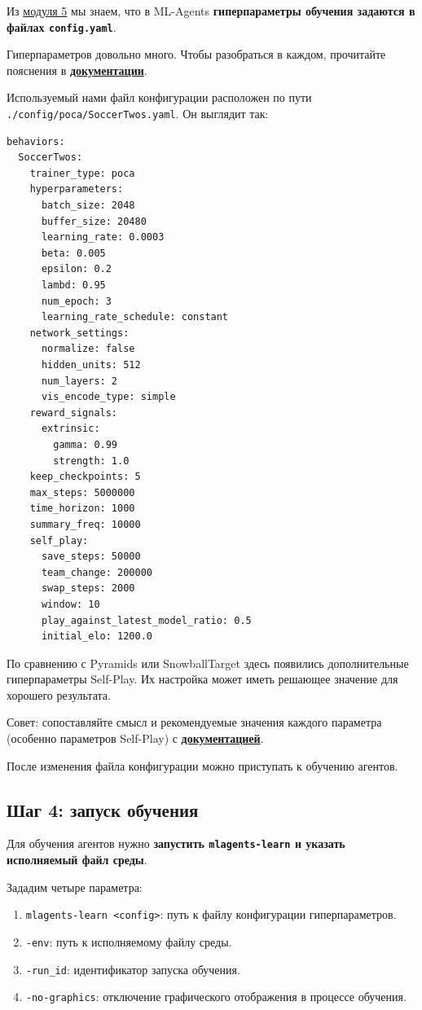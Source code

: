 \documentclass[11pt,a4paper]{article}
\begin{document}
Из \href{https://huggingface.co/deep-rl-course/unit5/introduction}{модуля 5} мы знаем, что в ML-Agents \textbf{гиперпараметры обучения задаются в файлах \texttt{config.yaml}}.

Гиперпараметров довольно много. Чтобы разобраться в каждом, прочитайте пояснения в \textbf{\href{https://github.com/Unity-Technologies/ml-agents/blob/release_20_docs/docs/Training-Configuration-File.md}{документации}}.

Используемый нами файл конфигурации расположен по пути \texttt{./config/poca/SoccerTwos.yaml}. Он выглядит так:

\begin{lstlisting}
behaviors:
  SoccerTwos:
    trainer_type: poca
    hyperparameters:
      batch_size: 2048
      buffer_size: 20480
      learning_rate: 0.0003
      beta: 0.005
      epsilon: 0.2
      lambd: 0.95
      num_epoch: 3
      learning_rate_schedule: constant
    network_settings:
      normalize: false
      hidden_units: 512
      num_layers: 2
      vis_encode_type: simple
    reward_signals:
      extrinsic:
        gamma: 0.99
        strength: 1.0
    keep_checkpoints: 5
    max_steps: 5000000
    time_horizon: 1000
    summary_freq: 10000
    self_play:
      save_steps: 50000
      team_change: 200000
      swap_steps: 2000
      window: 10
      play_against_latest_model_ratio: 0.5
      initial_elo: 1200.0
\end{lstlisting}

По сравнению с Pyramids или SnowballTarget здесь появились дополнительные гиперпараметры Self-Play. Их настройка может иметь решающее значение для хорошего результата.

Совет: сопоставляйте смысл и рекомендуемые значения каждого параметра (особенно параметров Self-Play) с \textbf{\href{https://github.com/Unity-Technologies/ml-agents/blob/release_20_docs/docs/Training-Configuration-File.md}{документацией}}.

После изменения файла конфигурации можно приступать к обучению агентов.

\subsection{Шаг 4: запуск обучения}\label{step-4-start-the-training}

Для обучения агентов нужно \textbf{запустить \texttt{mlagents-learn} и указать исполняемый файл среды}.

Зададим четыре параметра:

\begin{enumerate}
\def\labelenumi{\arabic{enumi}.}
\tightlist
\item
  \texttt{mlagents-learn\ \textless{}config\textgreater{}}: путь к файлу конфигурации гиперпараметров.
\item
  \texttt{-env}: путь к исполняемому файлу среды.
\item
  \texttt{-run\_id}: идентификатор запуска обучения.
\item
  \texttt{-no-graphics}: отключение графического отображения в процессе обучения.
\end{enumerate}
\end{document}
